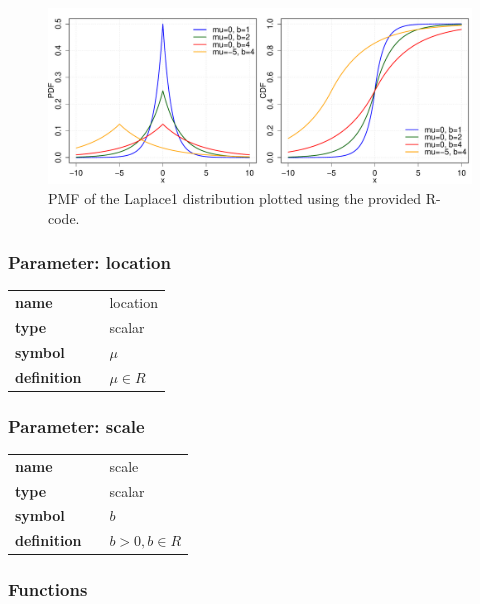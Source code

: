 \begin{figure}[ht!]
\centering
  \includegraphics[width=140mm]{pics/Laplace1_pdf_cdf.pdf}
 \caption{PMF of the Laplace1 distribution plotted using the provided R-code.}
 \label{fig:Laplace1_pdf_cdf}
\end{figure}

\subsubsection*{Parameter: location}

\noindent\begin{tabular}{p{2cm}cl}
\textbf{name} & & location \\
\textbf{type} & & scalar \\
\textbf{symbol} & & $\mu$  \\
\textbf{definition} & & $\mu \in R$
\end{tabular}
\subsubsection*{Parameter: scale}

\noindent\begin{tabular}{p{2cm}cl}
\textbf{name} & & scale \\
\textbf{type} & & scalar \\
\textbf{symbol} & & $b$  \\
\textbf{definition} & & $b > 0, b \in R$
\end{tabular}
\subsubsection*{Functions}

